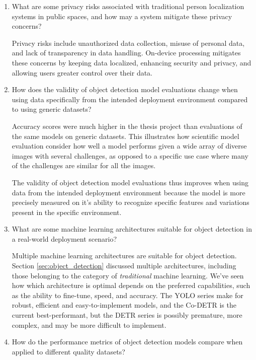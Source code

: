\begin{enumerate}
    \item What are some privacy risks associated with traditional person localization systems in public spaces, and how may a system mitigate these privacy concerns?
    
    Privacy risks include unauthorized data collection, misuse of personal data, and lack of transparency in data handling. On-device processing mitigates these concerns by keeping data localized, enhancing security and privacy, and allowing users greater control over their data. 
    
    \item How does the validity of object detection model evaluations change when using data specifically from the intended deployment environment compared to using generic datasets?

    Accuracy scores were much higher in the thesis project than evaluations of the same models on generic datasets. This illustrates how scientific model evaluation consider how well a model performs given a wide array of diverse images with several challenges, as opposed to a specific use case where many of the challenges are similar for all the images.  

    The validity of object detection model evaluations thus improves when using data from the intended deployment environment because the model is more precisely measured on it's ability to recognize specific features and variations present in the specific environment.
    
    \item What are some machine learning architectures suitable for object detection in a real-world deployment scenario?
    
    Multiple machine learning architectures are suitable for object detection. Section \ref{sec:object_detection} discussed multiple architectures, including those belonging to the category of \textit{traditional} machine learning. We've seen how which architecture is optimal depends on the preferred capabilities, such as the ability to fine-tune, speed, and accuracy. The YOLO series make for robust, efficient and easy-to-implement models, and the Co-DETR is the current best-performant, but the DETR series is possibly premature, more complex, and may be more difficult to implement.

    \item How do the performance metrics of object detection models compare when applied to different quality datasets?
    

\end{enumerate}

